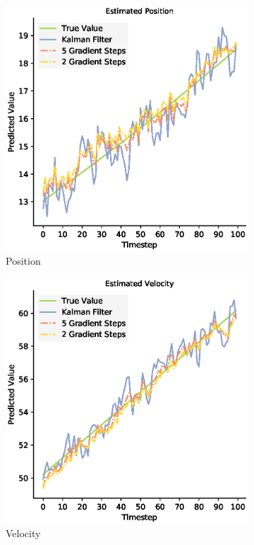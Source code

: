 \begin{figure}[H]
 \begin{subfigure}{0.32\textwidth}
 \centering
 \includegraphics[width=.8\linewidth]{chapter_3_figures/Estimated_Position_NKF_zoomed.eps}
 \caption{Position}
 \end{subfigure}
 \begin{subfigure}{0.32\textwidth}
 \centering
 \includegraphics[width=.8\linewidth]{chapter_3_figures/Estimated_Velocity_NKF_zoomed.eps}
 \caption{Velocity}
 \end{subfigure}
 \begin{subfigure}{0.32\textwidth}
 \centering

\end{subfigure}
\end{figure}
